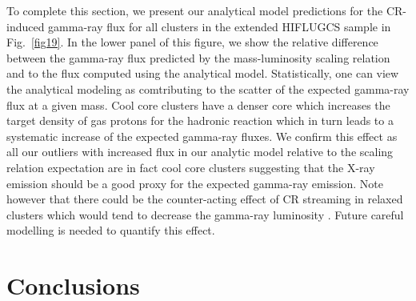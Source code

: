 \documentclass[10pt,aps,pra,reprint,amsmath,amsfonts,amssymb,showpacs,nofootinbib,floatfix]{revtex4-1}
\def\del#1{{}}
\newcommand{\rmn}{\mathrm}
\newcommand{\tev}{\rmn{TeV}}
\newcommand{\e}{\rmn{e}}
\newcommand{\eg}{E_\gamma}
\begin{document}
To complete this section, we present our analytical model predictions
for the CR-induced gamma-ray flux for all clusters in the extended
HIFLUGCS sample in Fig.~\ref{fig19}. In the lower panel of this
figure, we show the relative difference between the gamma-ray flux
predicted by the mass-luminosity scaling relation and to the flux
computed using the analytical model. Statistically, one can view the
analytical modeling as comtributing to the scatter of the expected
gamma-ray flux at a given mass. Cool core clusters have a denser core
which increases the target density of gas protons for the hadronic
reaction which in turn leads to a systematic increase of the expected
gamma-ray fluxes. We confirm this effect as all our outliers with
increased flux in our analytic model relative to the scaling relation
expectation are in fact cool core clusters suggesting that the X-ray
emission should be a good proxy for the expected gamma-ray
emission. Note however that there could be the counter-acting effect
of CR streaming in relaxed clusters which would tend to decrease the
gamma-ray luminosity \cite{2011A&A...527A..99E}. Future careful
modelling is needed to quantify this effect.


\del{
ANDERS: do you need this?
--) The dust turns up at about a factor 100 lower than the stars
--) The other figure show the spectral shape of the IC-star with the same
spectral shape as the dust, it shows the same gamma-ray slope as the dust
--) The reason why there is only a factor 10 difference in the break in the
gamma-ray emission between the star and dust is related to the KN. In our CR
paper, the last figure shows that at $\eg=100\,\tev$, the spectra is suppressed
with about a factor 10 (also depends on $\alpha_\e$). Since the dust photons
have a factor 10 higher energy, I expect this suppression at about 10~TeV. For
star photons the suppression should be at 100~GeV. So the star photons are
definitely KN suppressed, which explains the earlier break and the steeper
slope.
}


%



\section{Conclusions}
\end{document}
